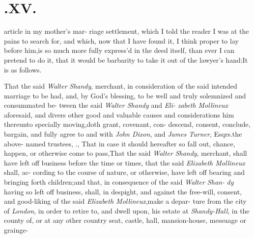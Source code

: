 \documentclass{article}
\begin{document}
\bigskip

\section{.\enspace XV.}

 article in my mother’s mar-\break 
riage settlement, which I told the\break
reader I was at the pains to search for, and which, now that I have
found it, I think proper to lay before him,\tsk  is so much more fully
express’d in the deed itself, than ever I can pretend to do it, that it
would be barbarity to take it out of the lawyer’s hand:\tsk  It is as
follows.

\indent\lqq{}\break
\lqq {}\quad That the said \textit{Walter}\break
\lqq \textit{Shandy}, merchant, in consideration of\break
\lqq the said intended marriage to be had,\break
\lqq and, by God’s blessing, to be well and 
\lqq truly solemnized and consummated be-\break
\lqq tween the said \textit{Walter Shandy} and \textit{Eli-}\break
\lqq \textit{zabeth Mollineux} aforesaid, and divers\break
\lqq other good and valuable causes and\break
\lqq considerations him thereunto specially\break
\lqq moving,\tsk  doth grant, covenant, con-\break
\lqq descend, consent, conclude, bargain,\break
\lqq and fully agree to and with \textit{John Dixon},\break
\lqq and \textit{James Turner}, Esqrs.\@ the above-\break
\lqq named trustees, \etc \etc.\tsk{},\tsk\break
\lqq That in case it should hereafter so fall\break
\lqq out, chance, happen, or otherwise\break
\lqq come to pass,\tsk  That the said \textit{Walter}\break
\lqq \textit{Shandy}, merchant, shall have left off\break
\lqq business before the time or times, that\break
\lqq the said \textit{Elizabeth Mollineux} shall, ac-\break
\lqq cording to the course of nature, or\break
\lqq otherwise, have left off bearing and\break
\lqq bringing forth children;\tsk  and that,\break
\lqq in consequence of the said \textit{Walter Shan-}\break
\lqq \textit{dy} having so left off business, shall, 
\lqq in despight, and against the free-will,\break
\lqq consent, and good-liking of the said\break
\lqq \textit{Elizabeth Mollineux},\tsk  make a depar-\break
\lqq ture from the city of \textit{London}, in order\break
\lqq to retire to, and dwell upon, his estate\break
\lqq at \textit{Shandy-Hall}, in the county of\tsh,\break
\lqq or at any other country seat, castle, hall,\break
\lqq mansion-house, messuage or grainge-\break
\end{document}
